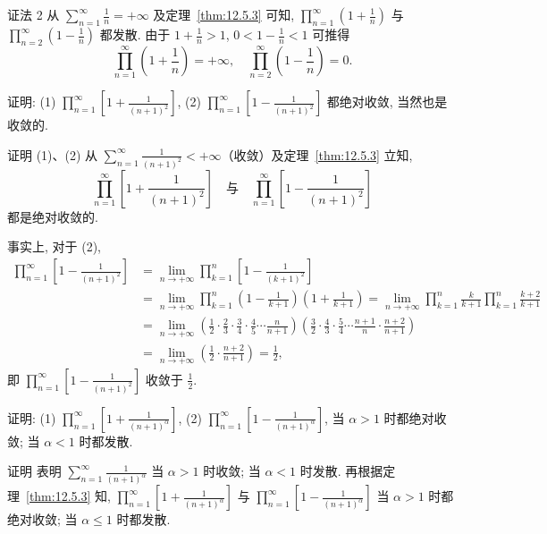 证法 2 从 $\sum_{n=1}^{\infty}\frac{1}{n}=+\infty$ 及定理~\ref{thm:12.5.3} 可知, $\prod_{n=1}^{\infty}\left(1+\frac{1}{n}\right)$ 与 $\prod_{n=2}^{\infty}\left(1-\frac{1}{n}\right)$ 都发散. 由于 $1+\frac{1}{n}>1$, $0<1-\frac{1}{n}<1$ 可推得
\[
  \prod_{n=1}^{\infty}\left(1+\frac{1}{n}\right)=+\infty,\quad\prod_{n=2}^{\infty}\left(1-\frac{1}{n}\right)=0.
\]

\begin{example}\label{ex:12.5.4}
证明:
(1) $\prod_{n=1}^{\infty}\left[1+\frac{1}{(n+1)^{2}}\right]$, (2) $\prod_{n=1}^{\infty}\left[1-\frac{1}{(n+1)^{2}}\right]$
都绝对收敛, 当然也是收敛的.
\end{example}

证明 (1)、(2) 从 $\sum_{n=1}^{\infty}\frac{1}{(n+1)^{2}}<+\infty$（收敛）及定理~\ref{thm:12.5.3} 立知,
\[
  \prod_{n=1}^{\infty}\left[1+\frac{1}{(n+1)^{2}}\right]\quad\text{与}\quad\prod_{n=1}^{\infty}\left[1-\frac{1}{(n+1)^{2}}\right]
\]
都是绝对收敛的.

事实上, 对于 (2),
\[
  \begin{aligned}
    \prod_{n=1}^{\infty}\left[1-\frac{1}{(n+1)^{2}}\right]&=\lim_{n\to+\infty}\prod_{k=1}^{n}\left[1-\frac{1}{(k+1)^{2}}\right]\\
    &=\lim_{n\to+\infty}\prod_{k=1}^{n}\left(1-\frac{1}{k+1}\right)\left(1+\frac{1}{k+1}\right)=\lim_{n\to+\infty}\prod_{k=1}^{n}\frac{k}{k+1}\prod_{k=1}^{n}\frac{k+2}{k+1}\\
    &=\lim_{n\to+\infty}\left(\frac{1}{2}\cdot\frac{2}{3}\cdot\frac{3}{4}\cdot\frac{4}{5}\cdots\frac{n}{n+1}\right)\left(\frac{3}{2}\cdot\frac{4}{3}\cdot\frac{5}{4}\cdots\frac{n+1}{n}\cdot\frac{n+2}{n+1}\right)\\
    &=\lim_{n\to+\infty}\left(\frac{1}{2}\cdot\frac{n+2}{n+1}\right)=\frac{1}{2},
  \end{aligned}
\]
即 $\prod_{n=1}^{\infty}\left[1-\frac{1}{(n+1)^{2}}\right]$ 收敛于 $\frac{1}{2}$.

\begin{example}\label{ex:12.5.5}
证明:
(1) $\prod_{n=1}^{\infty}\left[1+\frac{1}{(n+1)^{\alpha}}\right]$, (2) $\prod_{n=1}^{\infty}\left[1-\frac{1}{(n+1)^{\alpha}}\right]$,
当 $\alpha>1$ 时都绝对收敛; 当 $\alpha<1$ 时都发散.
\end{example}

证明  表明 $\sum_{n=1}^{\infty}\frac{1}{(n+1)^{\alpha}}$ 当 $\alpha>1$ 时收敛; 当 $\alpha<1$ 时发散. 再根据定理~\ref{thm:12.5.3} 知, $\prod_{n=1}^{\infty}\left[1+\frac{1}{(n+1)^{\alpha}}\right]$ 与 $\prod_{n=1}^{\infty}\left[1-\frac{1}{(n+1)^{\alpha}}\right]$ 当 $\alpha>1$ 时都绝对收敛; 当 $\alpha\leqslant1$ 时都发散.

